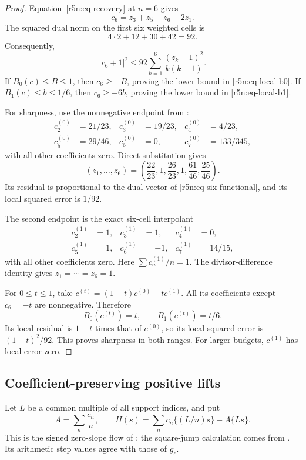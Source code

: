 \documentclass[11pt,a4paper]{article}
\theoremstyle{definition}\newtheorem{definition}[theorem]{Definition}
\theoremstyle{remark}\newtheorem{remark}[theorem]{Remark}
\numberwithin{equation}{section}
\begin{document}
\begin{proof}
Equation~\eqref{r5n:eq-recovery} at \(n=6\) gives
\[
 c_6=z_3+z_5-z_6-2z_1.
\]
The squared dual norm on the first six weighted cells is
\[
 4\cdot2+12+30+42=92.
\]
Consequently,
\begin{equation}
\label{r5n:eq-six-functional}
 |c_6+1|^2
 \le92\sum_{k=1}^6\frac{(z_k-1)^2}{k(k+1)}.
\end{equation}
If \(B_0(c)\le B\le1\), then \(c_6\ge-B\), proving the lower
bound in \eqref{r5n:eq-local-b0}. If \(B_1(c)\le b\le1/6\),
then \(c_6\ge-6b\), proving the lower bound in
\eqref{r5n:eq-local-b1}.

For sharpness, use the nonnegative endpoint from
\cite{TransferZeta}:
\[
 \begin{aligned}
 c^{(0)}_2&=21/23,&c^{(0)}_3&=19/23,&c^{(0)}_4&=4/23,\\
 c^{(0)}_5&=29/46,&c^{(0)}_6&=0,&c^{(0)}_7&=133/345,
 \end{aligned}
\]
with all other coefficients zero. Direct substitution gives
\[
 (z_1,\ldots,z_6)
 =\left(\frac{22}{23},1,\frac{26}{23},
                1,\frac{61}{46},\frac{25}{46}\right).
\]
Its residual is proportional to the dual vector of
\eqref{r5n:eq-six-functional}, and its local squared error is
\(1/92\).

The second endpoint is the exact six-cell interpolant
\[
 \begin{aligned}
 c^{(1)}_2&=1,&c^{(1)}_3&=1,&c^{(1)}_4&=0,\\
 c^{(1)}_5&=1,&c^{(1)}_6&=-1,&c^{(1)}_7&=14/15,
 \end{aligned}
\]
with all other coefficients zero. Here \(\sum c_n^{(1)}/n=1\).
The divisor-difference identity gives
\(z_1=\cdots=z_6=1\).

For \(0\le t\le1\), take
\(c^{(t)}=(1-t)c^{(0)}+tc^{(1)}\). All its coefficients except
\(c_6=-t\) are nonnegative. Therefore
\[
 B_0(c^{(t)})=t,\qquad B_1(c^{(t)})=t/6.
\]
Its local residual is \(1-t\) times that of \(c^{(0)}\), so its
local squared error is \((1-t)^2/92\).
This proves sharpness in both ranges. For larger budgets,
\(c^{(1)}\) has local error zero.
\end{proof}

\subsection{Coefficient-preserving positive lifts}
\label{r5n:subsec-coordinate-lift}

Let \(L\) be a common multiple of all support indices, and put
\[
 A=\sum_n\frac{c_n}{n},\qquad
 H(s)=\sum_nc_n\{(L/n)s\}-A\{Ls\}.
\]
This is the signed zero-slope flow of \cite{TransferZeta};
the square-jump calculation comes from \cite{VMRC200}.
Its arithmetic step values agree with those of \(g_c\).
\end{document}
